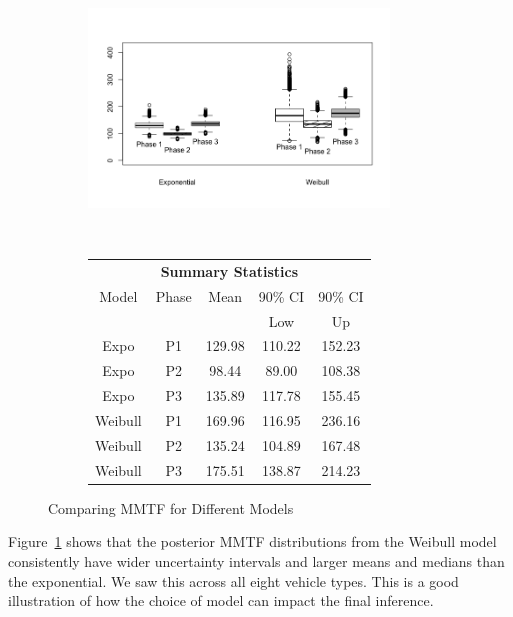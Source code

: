 \documentclass[12pt]{article}
\begin{document}
\begin{figure}[ht]
\centering
\begin{subfigure}{.5\textwidth}
  \centering
      \includegraphics[width=8cm, height=7cm]{Boxplots}
\end{subfigure}%
\begin{subfigure}{.5\textwidth}
  \center
  \begin{tabular}{|c|c|c|c|c|}
  \multicolumn{5}{c}{\textbf{Summary Statistics}} \\
  \cline{1-5}
  Model & Phase & Mean & 90\% CI & 90\% CI \\
   & & & Low & Up \\
  \hline
  Expo & P1   & 129.98   & 110.22 &  152.23 \\
  Expo & P2   & 98.44  & 89.00 &  108.38  \\
  Expo & P3   & 135.89   & 117.78 &  155.45 \\
  Weibull & P1   & 169.96  & 116.95 & 236.16 \\
  Weibull & P2   & 135.24   & 104.89 & 167.48 \\
  Weibull & P3   & 175.51   & 138.87 & 214.23 \\
  \hline
  \end{tabular}
\end{subfigure}
\caption{Comparing MMTF for Different Models}
\label{fig:MMTF Results}
\end{figure}

Figure~\ref{fig:MMTF Results} shows that the posterior MMTF distributions from the Weibull model consistently have wider uncertainty intervals and larger means and medians than the exponential.  We saw this across all eight vehicle types.  This is a good illustration of how the choice of model can impact the final inference.
\end{document}
